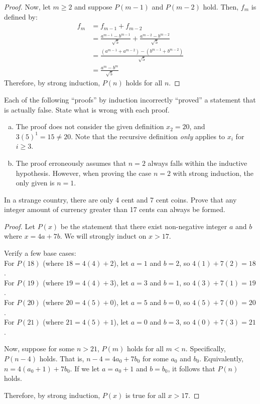 \documentclass{agony}
\begin{document}
\begin{enumerate}[(a)]
\begin{proof}
          Now, let $m \geq 2$ and suppose $P(m-1)$ and $P(m-2)$ hold. Then, $f_m$ is defined by:
          \begin{align*}
            f_m & = f_{m-1} + f_{m-2}                                                   \\
                & = \frac{a^{m-1}-b^{m-1}}{\sqrt{5}} + \frac{a^{m-2}-b^{m-2}}{\sqrt{5}} \\
                & = \frac{(a^{m-1} + a^{m-2}) - (b^{m-1} + b^{m-2})}{\sqrt{5}}          \\
                & = \frac{a^m - b^m}{\sqrt{5}}
          \end{align*}
          Therefore, by strong induction, $P(n)$ holds for all $n$.
        \end{proof}
\end{enumerate}


\question Each of the following ``proofs'' by induction incorrectly ``proved'' a statement that is actually false.
State what is wrong with each proof.
\begin{enumerate}[(a)]
  \item The proof does not consider the given definition $x_2=20$, and $3(5)^1 = 15 \neq 20$.
        Note that the recursive definition \emph{only} applies to $x_i$ for $i \geq 3$.
  \item The proof erroneously assumes that $n=2$ always falls within the inductive hypothesis.
        However, when proving the case $n=2$ with strong induction, the only given is $n=1$.
\end{enumerate}


\question In a strange country, there are only 4 cent and 7 cent coins.
Prove that any integer amount of currency greater than 17 cents can always be formed.
\begin{proof}
  Let $P(x)$ be the statement that there exist non-negative integer $a$ and $b$ where $x=4a+7b$.
  We will strongly induct on $x > 17$.

  Verify a few base cases: \\
  For $P(18)$ (where $18 = 4(4)+2$), let $a=1$ and $b=2$, so $4(1)+7(2)=18$. \\
  For $P(19)$ (where $19 = 4(4)+3$), let $a=3$ and $b=1$, so $4(3)+7(1)=19$. \\
  For $P(20)$ (where $20 = 4(5)+0$), let $a=5$ and $b=0$, so $4(5)+7(0)=20$. \\
  For $P(21)$ (where $21 = 4(5)+1$), let $a=0$ and $b=3$, so $4(0)+7(3)=21$.

  Now, suppose for some $n > 21$, $P(m)$ holds for all $m < n$.
  Specifically, $P(n-4)$ holds.
  That is, $n-4 = 4a_0 + 7b_0$ for some $a_0$ and $b_0$.
  Equivalently, $n = 4(a_0+1) + 7b_0$.
  If we let $a = a_0+1$ and $b = b_0$, it follows that $P(n)$ holds.


  Therefore, by strong induction, $P(x)$ is true for all $x > 17$.
\end{proof}
\end{document}
